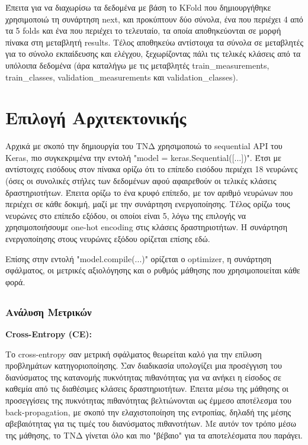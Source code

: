 \documentclass[12pt,a4paper]{article}
\begin{document}
Έπειτα για να διαχωρίσω τα δεδομένα με βάση το KFold που δημιουργήθηκε χρησιμοποιώ τη συνάρτηση next, και προκύπτουν δύο σύνολα, ένα που περιέχει 4 από τα 5 folds και ένα που περιέχει το τελευταίο, τα οποία αποθηκεύονται σε μορφή πίνακα στη μεταβλητή results. Τέλος αποθηκεύω αντίστοιχα τα σύνολα σε μεταβλητές για το σύνολο εκπαίδευσης και ελέγχου, ξεχωρίζοντας πάλι τις τελικές κλάσεις από τα υπόλοιπα δεδομένα (άρα καταλήγω με τις μεταβλητές train\_measurements, train\_classes, validation\_measurements και validation\_classes).

\section{Επιλογή Αρχιτεκτονικής}
\label{Επιλογή Αρχιτεκτονικής}

Αρχικά με σκοπό την δημιουργία του ΤΝΔ χρησιμοποιώ το sequential API του Keras, πιο συγκεκριμένα την εντολή "model = keras.Sequential([...])". Έτσι με αντίστοιχες εισόδους στον πίνακα ορίζω ότι το επίπεδο εισόδου περιέχει 18 νευρώνες (όσες οι συνολικές στήλες των δεδομένων αφού αφαιρεθούν οι τελικές κλάσεις δραστηριοτήτων. Έπειτα ορίζω το ένα κρυφό επίπεδο, με τον αριθμό νευρώνων που περιέχει σε κάθε δοκιμή, μαζί με την συνάρτηση ενεργοποίησης. Τέλος ορίζω τους νευρώνες στο επίπεδο εξόδου, οι οποίοι είναι 5, λόγω της επιλογής να χρησιμοποιήσουμε one-hot encoding στις κλάσεις δραστηριοτήτων. Η συνάρτηση ενεργοποίησης στους νευρώνες εξόδου ορίζεται επίσης εδώ.

Επίσης στην εντολή "model.compile(...)" ορίζεται ο optimizer, η συνάρτηση σφάλματος, οι μετρικές αξιολόγησης και ο ρυθμός μάθησης που χρησιμοποιείται κάθε φορά.

\subsection{}

\subsubsection{Ανάλυση Μετρικών}
\label{Ανάλυση Μετρικών}

\textbf{Cross-Entropy (CE):}

Το cross-entropy σαν μετρική σφάλματος θεωρείται καλό για την επίλυση προβλημάτων κατηγοριοποίησης. Σαν διαδικασία υπολογίζει μια προσέγγιση του διανύσματος της κατανομής πυκνότητας πιθανότητας για να ανήκει η είσοδος σε καθεμία από τις διαθέσιμες κλάσεις δραστηριοτήτων. Έπειτα μέσω της μάθησης οι προσεγγίσεις της πυκνότητας πιθανότητας βελτιώνονται ως έμμεσο αποτέλεσμα του back-propagation, με σκοπό την ελαχιστοποίηση της εντροπίας, δηλαδή της μέσης αβεβαιότητας για τις τιμές του διανύσματος πιθανοτήτων. Με αυτόν τον τρόπο μέσω της μάθησης, το ΤΝΔ γίνεται όλο και πιο "βέβαιο" για τα αποτελέσματα που παράγει.
\end{document}
